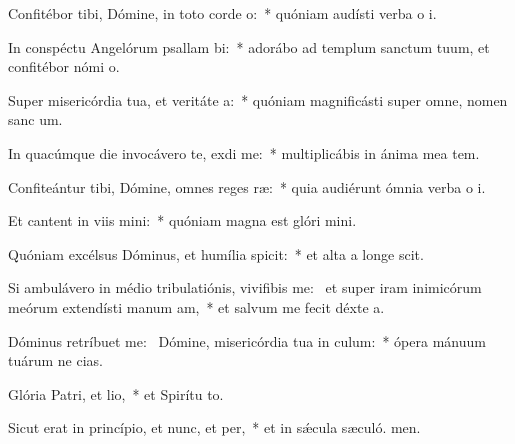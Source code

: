 \item Confitébor tibi, Dómine, in toto corde o:~* quóniam audísti verba o i.
\item In conspéctu Angelórum psallam bi:~* adorábo ad templum sanctum tuum, et confitébor nómi o.
\item Super misericórdia tua, et veritáte a:~* quóniam magnificásti super omne, nomen sanc um.
\item In quacúmque die invocávero te, exdi me:~* multiplicábis in ánima mea tem.
\item Confiteántur tibi, Dómine, omnes reges ræ:~* quia audiérunt ómnia verba o i.
\item Et cantent in viis mini:~* quóniam magna est glóri mini.
\item Quóniam excélsus Dóminus, et humília spicit:~* et alta a longe scit.
\item Si ambulávero in médio tribulatiónis, vivifibis me:~\pscross{} et super iram inimicórum meórum extendísti manum am,~* et salvum me fecit déxte a.
\item Dóminus retríbuet  me:~\pscross{} Dómine, misericórdia tua in culum:~* ópera mánuum tuárum ne cias.
\item Glória Patri, et lio,~* et Spirítu to.
\item Sicut erat in princípio, et nunc, et per,~* et in sǽcula sæculó. men.
